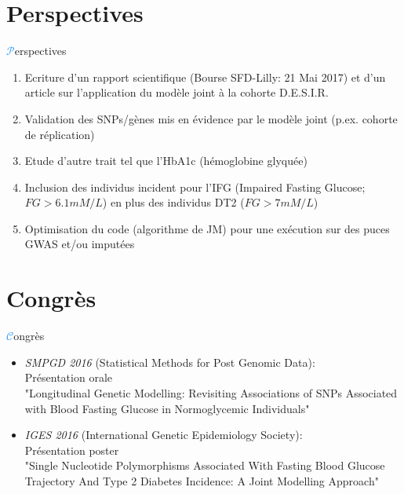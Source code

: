 \section{Perspectives}
\begin{frame}{{\huge\textcolor{dodgerblue}{$\mathcal{P}$}}erspectives}
\par{%
\begin{enumerate}
    \item Ecriture d’un \textcolor{springgreen3}{rapport scientifique} (Bourse SFD-Lilly: 21 Mai 2017) et d'un \textcolor{springgreen3}{article sur l'application du modèle joint à la cohorte D.E.S.I.R.}
    \item \textcolor{springgreen3}{Validation des SNPs/gènes} mis en évidence par le modèle joint (p.ex. cohorte de réplication)
    \item Etude d'autre trait tel que l'\textcolor{springgreen3}{HbA1c} (hémoglobine glyquée)
    \item Inclusion des individus incident pour l'\textcolor{springgreen3}{IFG} (Impaired Fasting Glucose; $FG>6.1mM/L$) en plus des individus DT2 ($FG>7mM/L$)
    \item \textcolor{springgreen3}{Optimisation} du code (algorithme de JM) pour une exécution sur des puces GWAS et/ou imputées
\end{enumerate}
}
\end{frame}


\section{Congrès}
\begin{frame}{{\huge\textcolor{dodgerblue}{$\mathcal{C}$}}ongrès}
\begin{itemize}
    \item \textcolor{springgreen3}{\textit{SMPGD 2016}} (Statistical Methods for Post Genomic Data): \\Présentation orale \\{\footnotesize "Longitudinal Genetic Modelling: Revisiting Associations of SNPs Associated with Blood Fasting Glucose in Normoglycemic Individuals"}
    \vspace{1em}
    \item \textcolor{springgreen3}{\textit{IGES 2016}} (International Genetic Epidemiology Society): \\Présentation poster \\{\footnotesize "Single Nucleotide Polymorphisms Associated With Fasting Blood Glucose Trajectory And Type 2 Diabetes Incidence: A Joint Modelling Approach"}
\end{itemize}
\end{frame}

